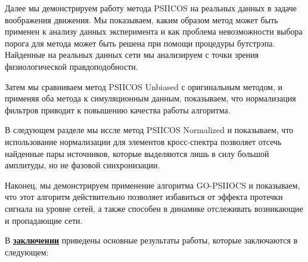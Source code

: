 Далее мы демонстрируем работу метода PSIICOS на реальных данных в задаче
воображения движения. Мы показываем, каким образом метод может быть применен к
анализу данных эксперимента и как проблема невозможности выбора порога для
метода может быть решена при помощи процедуры бутстрэпа.  Найденные на реальных
данных сети мы анализируем с точки зрения физиологической правдоподобности.

Затем мы сравниваем метод PSIICOS Unbiased с оригинальным методом, и применяя
оба метода к симуляционным данным, показываем, что нормализация фильтров
приводит к повышению качества работы алгоритма.

В следующем разделе мы иссле метод PSIICOS Normalized и показываем, что
использование нормализации для элементов кросс-спектра позволяет отсечь
найденные пары источников, которые выделяются лишь в силу большой амплитуды, но
не фазовой синхронизации.

Наконец, мы демонстрируем применение алгоритма GO-PSIIOCS и показываем, что
этот алгоритм действительно позволяет избавиться от эффекта протечки сигнала на
уровне сетей, а также способен в динамике отслеживать возникающие и пропадающие
сети.



В \underline{\textbf{заключении}} приведены основные результаты работы, которые заключаются в следующем:




